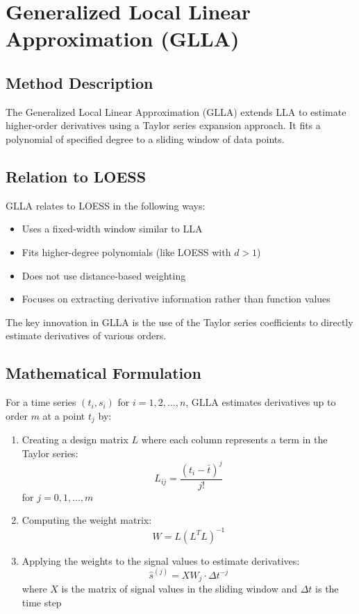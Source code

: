 \documentclass{article}
\begin{document}
\section{Generalized Local Linear Approximation (GLLA)}

\subsection{Method Description}

The Generalized Local Linear Approximation (GLLA) extends LLA to estimate higher-order derivatives using a Taylor series expansion approach. It fits a polynomial of specified degree to a sliding window of data points.

\subsection{Relation to LOESS}

GLLA relates to LOESS in the following ways:

\begin{itemize}
    \item Uses a fixed-width window similar to LLA
    \item Fits higher-degree polynomials (like LOESS with $d > 1$)
    \item Does not use distance-based weighting
    \item Focuses on extracting derivative information rather than function values
\end{itemize}

The key innovation in GLLA is the use of the Taylor series coefficients to directly estimate derivatives of various orders.

\subsection{Mathematical Formulation}

For a time series $(t_i, s_i)$ for $i = 1, 2, \ldots, n$, GLLA estimates derivatives up to order $m$ at a point $t_j$ by:

\begin{enumerate}
    \item Creating a design matrix $L$ where each column represents a term in the Taylor series:
    \begin{equation}
        L_{ij} = \frac{(t_i - \bar{t})^j}{j!}
    \end{equation}
    for $j = 0, 1, \ldots, m$
    
    \item Computing the weight matrix:
    \begin{equation}
        W = L(L^T L)^{-1}
    \end{equation}
    
    \item Applying the weights to the signal values to estimate derivatives:
    \begin{equation}
        \hat{s}^{(j)} = X W_j \cdot \Delta t^{-j}
    \end{equation}
    where $X$ is the matrix of signal values in the sliding window and $\Delta t$ is the time step
\end{enumerate}
\end{document}
